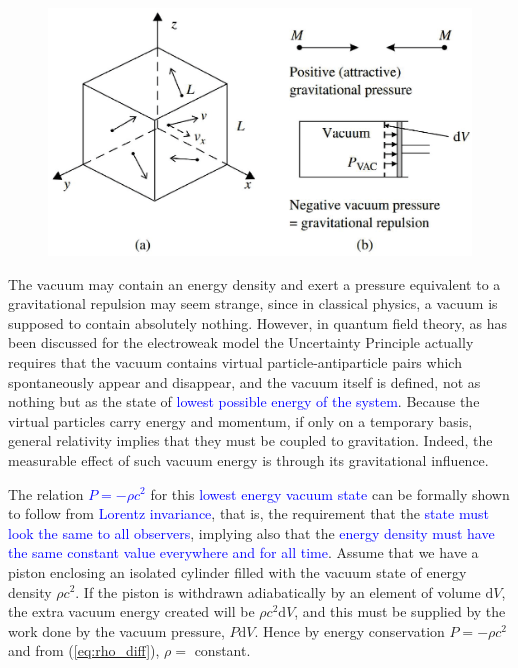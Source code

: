 \documentclass[12pt,a4paper]{article}
\newcommand{\dif}{\mathrm{d}}
\newcounter{theo}[section]\setcounter{theo}{0}
\begin{document}
\begin{figure}
\centering
\includegraphics[height=8.cm,angle=0]{equations_of_state.eps}
\caption{} 
\label{fig:equations_of_state}
\end{figure}

The vacuum may contain an energy density and exert a pressure equivalent to a gravitational repulsion may seem strange, since in classical physics, a vacuum is supposed to contain absolutely nothing. However, in quantum field theory, as has been discussed for the electroweak model the Uncertainty Principle actually requires that the vacuum contains virtual particle-antiparticle pairs which spontaneously appear and disappear, and the vacuum itself is defined, not as nothing but as the state of \textcolor{blue}{lowest possible energy of the system}. Because the virtual particles carry energy and momentum, if only on a temporary basis, general relativity implies that they must be coupled to gravitation. Indeed, the measurable effect of such vacuum energy is through its gravitational influence.

The relation \textcolor{blue}{$P = -\rho c^2$} for this \textcolor{blue}{lowest energy vacuum state} can be formally shown to follow from \textcolor{blue}{Lorentz invariance}, that is, the requirement that the \textcolor{blue}{state must look the same to all observers}, implying also that the \textcolor{blue}{energy density must have the same constant value everywhere and for all time}. Assume that we have a piston enclosing an isolated cylinder filled with the vacuum state of energy density $\rho c^2$. If the piston is withdrawn adiabatically by an element of volume $\dif V$, the extra vacuum energy created will be $\rho c^2 \dif V$, and this must be supplied by the work done by the vacuum pressure, $P \dif V$. Hence by energy conservation $P = -\rho c^2$ and from (\ref{eq:rho_diff}), $\rho =$ constant.
\end{document}

